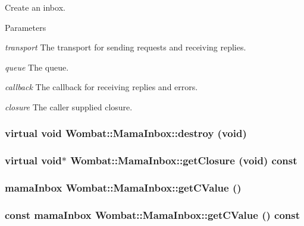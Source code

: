 Create an inbox. 
\begin{DoxyParams}{Parameters}
\item[{\em transport}]The transport for sending requests and receiving replies. \item[{\em queue}]The queue. \item[{\em callback}]The callback for receiving replies and errors. \item[{\em closure}]The caller supplied closure. \end{DoxyParams}
\hypertarget{classWombat_1_1MamaInbox_ac39e457892aa15e908ce28211580feca}{
\subsubsection[{destroy}]{\setlength{\rightskip}{0pt plus 5cm}virtual void Wombat::MamaInbox::destroy (void)}}
\label{classWombat_1_1MamaInbox_ac39e457892aa15e908ce28211580feca}
\hypertarget{classWombat_1_1MamaInbox_ac269097bbab63c1196746de167164053}{
\subsubsection[{getClosure}]{\setlength{\rightskip}{0pt plus 5cm}virtual void$\ast$ Wombat::MamaInbox::getClosure (void) const}}
\label{classWombat_1_1MamaInbox_ac269097bbab63c1196746de167164053}
\hypertarget{classWombat_1_1MamaInbox_a1ca3b952c2c19c008e7efcce340e683f}{
\subsubsection[{getCValue}]{\setlength{\rightskip}{0pt plus 5cm}mamaInbox Wombat::MamaInbox::getCValue ()}}
\label{classWombat_1_1MamaInbox_a1ca3b952c2c19c008e7efcce340e683f}
\hypertarget{classWombat_1_1MamaInbox_aec99b00cb3ed6b6d77331dd052efa7c3}{
\subsubsection[{getCValue}]{\setlength{\rightskip}{0pt plus 5cm}const mamaInbox Wombat::MamaInbox::getCValue () const}}
\label{classWombat_1_1MamaInbox_aec99b00cb3ed6b6d77331dd052efa7c3}
